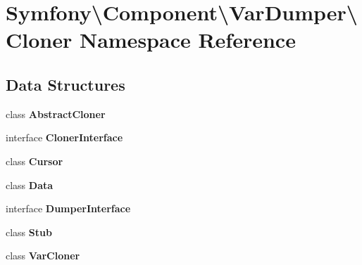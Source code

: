 \section{Symfony\textbackslash{}Component\textbackslash{}Var\+Dumper\textbackslash{}Cloner Namespace Reference}
\label{namespace_symfony_1_1_component_1_1_var_dumper_1_1_cloner}
\subsection*{Data Structures}
\begin{DoxyCompactItemize}
\item 
class {\bf Abstract\+Cloner}
\item 
interface {\bf Cloner\+Interface}
\item 
class {\bf Cursor}
\item 
class {\bf Data}
\item 
interface {\bf Dumper\+Interface}
\item 
class {\bf Stub}
\item 
class {\bf Var\+Cloner}
\end{DoxyCompactItemize}

